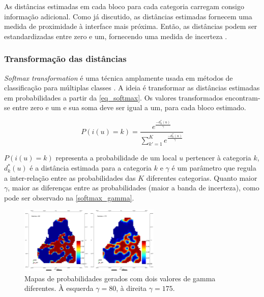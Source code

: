 As distâncias estimadas em cada bloco para cada categoria carregam consigo informação adicional. Como já discutido, as distâncias estimadas fornecem uma medida de proximidade à interface mais próxima. Então, as distâncias podem ser estandardizadas entre zero e um, fornecendo uma medida de incerteza \cite{maureira}.

\subsubsection{Transformação das distâncias}

\textit{Softmax transformation} é uma técnica amplamente usada em métodos de classificação para múltiplas classes \cite{mccullagh}. A ideia é transformar as distâncias estimadas em probabilidades a partir da \autoref{eq_softmax}. Os valores transformados encontram-se entre zero e um e  sua soma deve ser igual a um, para cada bloco estimado.

\begin{equation}
	P(i(u)=k)=\frac{e^\frac{-d^*_k(u)}{\gamma}}{\sum_{k'=1}^{K}e^\frac{-d^*_k(u)}{\gamma}}
    \label{eq_softmax}
\end{equation}

$P(i(u)=k)$ representa a probabilidade de um local $u$ pertencer à categoria $k$, $d^*_k(u)$ é a distância estimada para a categoria $k$ e $\gamma$ é um parâmetro que regula a inter-relação entre as probabilidades das $K$ diferentes categorias. Quanto maior $\gamma$, maior as diferenças entre as probabilidades (maior a banda de incerteza), como pode ser observado na \autoref{softmax_gamma}.

\begin{figure}[!ht]
	\caption{\label{softmax_gamma}Mapas de probabilidades gerados com dois valores de gamma diferentes. À esquerda $\gamma=80$, à direita $\gamma=175$.}
	\begin{center}
		\includegraphics[width=0.6\textwidth]{modelagem_geologica/softmax_gama}
	\end{center}
\end{figure}

